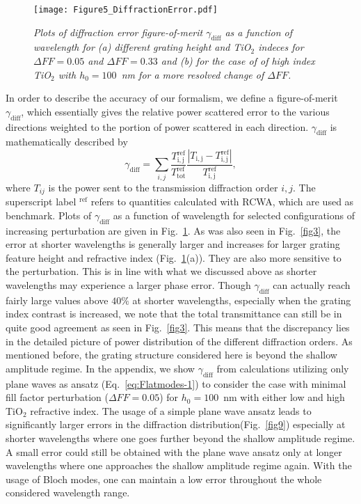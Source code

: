 \documentclass[ floatfix,reprint,amsmath,amssymb,aps,prb]{revtex4-1}
\begin{document}
\begin{figure}[ht]

	\texttt{[image: Figure5\_DiffractionError.pdf]}
	\caption{\textit{Plots of diffraction error figure-of-merit $\gamma_\mathrm{diff}$ as a function of wavelength for (a) different grating height and TiO$_2$ indeces for $\Delta FF=0.05$ and $\Delta FF=0.33$ and (b) for the case of of high index TiO$_2$ with $h_0 = 100$~nm for a more resolved change of $\Delta FF$.   }}\label{fig5}

\end{figure}
In order to describe the accuracy of our formalism, we define a figure-of-merit $\gamma_\mathrm{diff}$, which essentially gives the relative power scattered error to the various directions weighted to the portion of power scattered in each direction. $\gamma_\mathrm{diff}$ is mathematically described by
\begin{equation}
\gamma_\mathrm{diff}=\sum_{i,j}\frac{T^{\mathrm{ref}}_\mathrm{i,j}}{T^{\mathrm{ref}}_{\mathrm{tot}}}\frac{|T_\mathrm{i,j} - T^{\mathrm{ref}}_\mathrm{i,j}|} {T^{\mathrm{ref}}_\mathrm{i,j}}, \label{eq:Errordetailed}
\end{equation}
where $T_{ij}$ is the power sent to the transmission diffraction order $i,j$. The superscript label $^{\mathrm{ref}}$ refers to quantities calculated with RCWA, which are used as benchmark. Plots of $\gamma_\mathrm{diff}$ as a function of wavelength for selected configurations of increasing perturbation are given in Fig.~\ref{fig5}. As was also seen in Fig.~\ref{fig3}, the error at shorter wavelengths is generally larger and increases for larger grating feature height and refractive index (Fig.~\ref{fig5}(a)). They are also more sensitive to the perturbation.  This is in line with what we discussed above as shorter wavelengths may experience a larger phase error. Though $\gamma_\mathrm{diff}$ can actually reach fairly large values above $40\%$ at shorter wavelengths, especially when the grating index contrast is increased, we note that the total transmittance can still be in quite good agreement as seen in Fig.~\ref{fig3}. This means that the discrepancy lies in the detailed picture of power distribution of the different diffraction orders.  As mentioned before, the grating structure considered here is beyond the shallow amplitude regime. In the appendix, we show $\gamma_\mathrm{diff}$ from calculations utilizing only plane waves as ansatz (Eq.~\ref{eq:Flatmodes-1}) to consider the case with minimal fill factor perturbation ($\Delta FF=0.05$) for $h_0 = 100$~nm with either low and high TiO$_2$ refractive index. The usage of a simple plane wave ansatz leads to significantly larger errors in the diffraction distribution(Fig.~\ref{fig9}) especially at shorter wavelengths where one goes further beyond the shallow amplitude regime. A small error could still be obtained with the plane wave ansatz only at longer wavelengths where one approaches the shallow amplitude regime again. With the usage of Bloch modes, one can maintain a low error throughout the whole considered wavelength range. 
\end{document}
